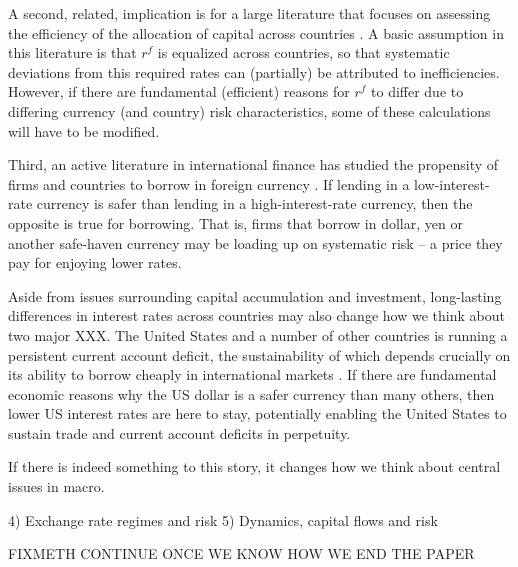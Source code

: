 A second, related, implication is for a large literature that focuses
on assessing the efficiency of the allocation of capital across
countries \citep{HallJones1997, CaselliFeyrer2007}. A basic assumption
in this literature is that $r^f$ is equalized across countries, so
that systematic deviations from this required rates can (partially) be
attributed to inefficiencies. However, if there are fundamental
(efficient) reasons for $r^f$ to differ due to differing currency (and
country) risk characteristics, some of these calculations will have to
be modified.

Third, an active literature in international finance has studied the
propensity of firms and countries to borrow in foreign currency
\citep{DuSchreger2016, KalemliOzcanetal2019}. If lending in a
low-interest-rate currency is safer than lending in a
high-interest-rate currency, then the opposite is true for borrowing.
That is, firms that borrow in dollar, yen or another safe-haven
currency may be loading up on systematic risk -- a price they pay for
enjoying lower rates.

Aside from issues surrounding capital accumulation and investment,
long-lasting differences in interest rates across countries may also
change how we think about two major XXX. The United States and a
number of other countries is running a persistent current account
deficit, the sustainability of which depends crucially on its ability
to borrow cheaply in international markets \citep{GourinchasRey2007}.
If there are fundamental economic reasons why the US dollar is a safer
currency than many others, then lower US interest rates are here to
stay, potentially enabling the United States to sustain trade and
current account deficits in perpetuity.

If there is indeed something to this story, it changes how we think
about central issues in macro.

4) Exchange rate regimes and risk 5) Dynamics, capital flows and risk

FIXMETH CONTINUE ONCE WE KNOW HOW WE END THE PAPER